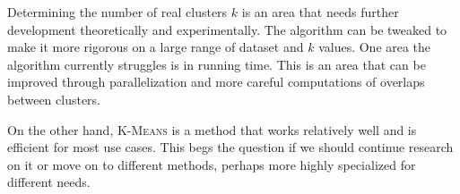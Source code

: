 \documentclass[12pt]{dalthesis}
\newcommand*{\kmeans}{\textsc{K-Means} } %
\begin{document}
Determining the number of real clusters $k$ is an area that needs further development theoretically and experimentally. The algorithm can be tweaked to make it more rigorous on a large range of dataset and $k$ values. One area the algorithm currently struggles is in running time. This is an area that can be improved through parallelization and more careful computations of overlaps between clusters.

On the other hand, \kmeans is a method that works relatively well and is efficient for most use cases. This begs the question if we should continue research on it or move on to different methods, perhaps more highly specialized for different needs.



\end{document}
